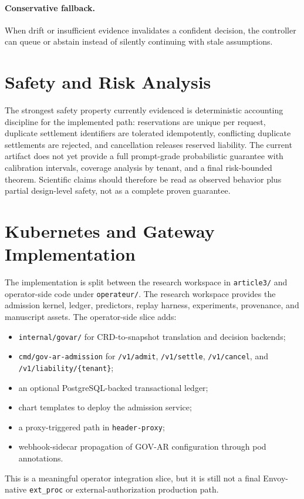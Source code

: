 \documentclass[10pt,journal,compsoc]{IEEEtran}
\begin{document}
\paragraph{Conservative fallback.}
When drift or insufficient evidence invalidates a confident decision, the
controller can queue or abstain instead of silently continuing with stale
assumptions.

\section{Safety and Risk Analysis}
The strongest safety property currently evidenced is deterministic accounting
discipline for the implemented path: reservations are unique per request,
duplicate settlement identifiers are tolerated idempotently, conflicting
duplicate settlements are rejected, and cancellation releases reserved
liability. The current artifact does not yet provide a full prompt-grade
probabilistic guarantee with calibration intervals, coverage analysis by tenant,
and a final risk-bounded theorem. Scientific claims should therefore be read as
observed behavior plus partial design-level safety, not as a complete proven
guarantee.

\section{Kubernetes and Gateway Implementation}
The implementation is split between the research workspace in
\texttt{article3/} and operator-side code under \texttt{operateur/}. The
research workspace provides the admission kernel, ledger, predictors, replay
harness, experiments, provenance, and manuscript assets. The operator-side
slice adds:
\begin{itemize}
  \item \texttt{internal/govar/} for CRD-to-snapshot translation and decision
        backends;
  \item \texttt{cmd/gov-ar-admission} for \texttt{/v1/admit},
        \texttt{/v1/settle}, \texttt{/v1/cancel}, and
        \texttt{/v1/liability/\{tenant\}};
  \item an optional PostgreSQL-backed transactional ledger;
  \item chart templates to deploy the admission service;
  \item a proxy-triggered path in \texttt{header-proxy};
  \item webhook-sidecar propagation of GOV-AR configuration through pod
        annotations.
\end{itemize}
This is a meaningful operator integration slice, but it is still not a final
Envoy-native \texttt{ext\_proc} or external-authorization production path.
\end{document}
